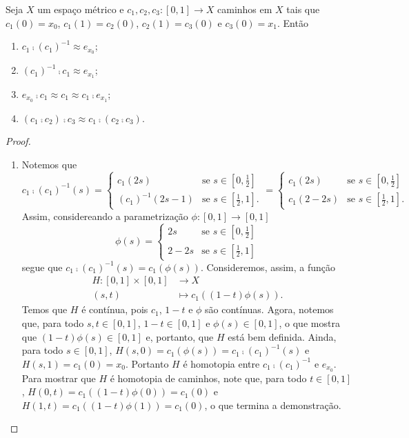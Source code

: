 \begin{prop}
\label{prop:homo}
	Seja $X$ um espaço métrico e $c_1,c_2,c_3: [0,1] \to X$ caminhos em $X$ tais que $c_1(0)=x_0$, $c_1(1)=c_2(0)$, $c_2(1)=c_3(0)$ e $c_3(0)=x_1$. Então
	\begin{enumerate}
	\item $c_1 \comp (c_1)^{-1} \approx e_{x_0}$;
	\item $(c_1)^{-1} \comp c_1 \approx e_{x_1}$;
	\item $e_{x_0} \comp c_1 \approx c_1 \approx c_1 \comp e_{x_1}$;
	\item $(c_1 \comp c_2) \comp c_3 \approx c_1 \comp (c_2 \comp c_3)$.
	\end{enumerate}
\end{prop}
\begin{proof}
	\begin{enumerate}
	\item Notemos que
	\begin{equation*}
	c_1 \comp (c_1)^{-1}(s)
		=
			\begin{cases}
				c_1(2s) &\text{se $s \in [0,\frac{1}{2}]$} \\
				(c_1)^{-1}(2s-1) &\text{se $s \in [\frac{1}{2},1]$}.
			\end{cases}
		=
			\begin{cases}
				c_1(2s) &\text{se $s \in [0,\frac{1}{2}]$} \\
				c_1(2-2s) &\text{se $s \in [\frac{1}{2},1]$}.
			\end{cases}
	\end{equation*}
	Assim, considereando a parametrização $\phi: [0,1] \to [0,1]$
	\begin{equation*}
	\phi(s)
		=
			\begin{cases}
				2s &\text{se $s \in [0,\frac{1}{2}]$} \\
				2-2s &\text{se $s \in [\frac{1}{2},1]$}
			\end{cases}
	\end{equation*}
segue que $c_1 \comp (c_1)^{-1}(s) = c_1(\phi(s))$.
Consideremos, assim, a função
	\begin{align*}
	H: [0,1] \times [0,1] &\to X \\
		(s,t) &\mapsto c_1((1-t)\phi(s)).
	\end{align*}
	Temos que $H$ é contínua, pois $c_1$, $1-t$ e $\phi$ são contínuas. Agora, notemos que, para todo $s,t \in [0,1]$, $1-t \in [0,1]$ e $\phi(s) \in [0,1]$, o que mostra que $(1-t)\phi(s) \in [0,1]$ e, portanto, que $H$ está bem definida. Ainda, para todo $s \in [0,1]$, $H(s,0)=c_1(\phi(s))=c_1 \comp (c_1)^{-1}(s)$ e $H(s,1)=c_1(0)=x_0$. Portanto $H$ é homotopia entre $c_1 \comp (c_1)^{-1}$ e $e_{x_0}$.	Para mostrar que $H$ é homotopia de caminhos, note que, para todo $t \in [0,1]$,	$H(0,t)=c_1((1-t)\phi(0))=c_1(0)$ e $H(1,t)=c_1((1-t)\phi(1))=c_1(0)$, o que termina a demonstração.
	

\end{enumerate}
\end{proof}

